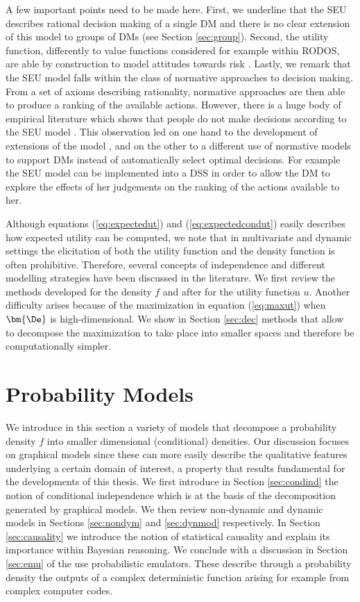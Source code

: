 A few important points need to be made here. First, we underline that the \gls{SEU} describes rational decision making of a single \gls{DM} and there is no clear extension of this model to groups of \glspl{DM} (see Section \ref{sec:group}). Second, the utility function, differently to value functions considered for example within \gls{RODOS}, are able by construction  to model attitudes towards risk \citep[see e.g.][]{Keeney1993a}. Lastly, we remark that the \gls{SEU} model falls within the class of normative approaches to decision making. From a set of axioms describing rationality, normative approaches are then able to produce a ranking of the available actions. However, there is a huge body of empirical literature which shows that people do not make decisions according to the \gls{SEU} model \citep{Tversky1974}. This observation led on one hand to the development of extensions of the model \citep[e.g. prospect theory,][]{Kahneman1979}, and on the other to a different use of normative models to support \glspl{DM} instead of automatically select optimal decisions. For example the \gls{SEU} model can be implemented into a \gls{DSS} in order to allow the \gls{DM} to explore the effects of her judgements on the ranking of the actions available to her.

Although equations (\ref{eq:expectedut}) and (\ref{eq:expectedcondut}) easily describes how expected utility can be computed, we note that in multivariate and dynamic settings the elicitation of both the utility function and the density function is often prohibitive. Therefore, several concepts of independence and different modelling strategies have been discussed in the literature. We  first review the methods developed for the density $f$ and after for the utility function $u$. Another difficulty arises because of the maximization in equation (\ref{eq:maxut}) when $\bm{\De}$ is high-dimensional. We  show in Section \ref{sec:dec} methods that allow to decompose the maximization to take place into smaller spaces and therefore be computationally simpler. 
   
\section{Probability Models}
\label{sec:prob}
We introduce in this section a variety of models that decompose a probability density $f$ into smaller dimensional (conditional) densities. Our discussion focuses on graphical models since these can more easily describe the qualitative features underlying a certain domain of interest, a property that results fundamental for the developments of this thesis. We first introduce in Section \ref{sec:condind} the notion of conditional independence which is at the basis of the decomposition generated by graphical models. We then review non-dynamic and dynamic models in Sections \ref{sec:nondym} and \ref{sec:dynmod} respectively. In Section \ref{sec:causality} we introduce the notion of statistical causality and explain its importance within Bayesian reasoning. We conclude with a discussion in Section \ref{sec:emu} of the use probabilistic emulators. These  describe through a probability density the outputs of a complex deterministic function arising for example from complex computer codes. 
 
